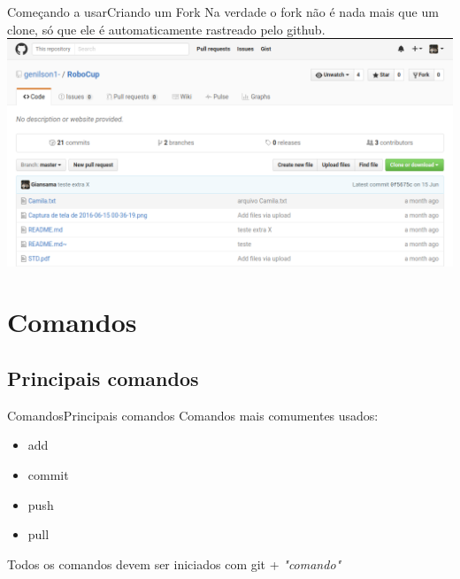 \documentclass[10pt]{beamer}
\begin{document}
\begin{frame}{Começando a usar}{Criando um Fork}
Na verdade o fork não é nada mais que um clone, só que ele é automaticamente rastreado pelo github.
\includegraphics[scale=0.27]{AAUgraphics/fork}
\end{frame}


\section{Comandos}
\subsection{Principais comandos}
\begin{frame}{Comandos}{Principais comandos}
Comandos mais comumentes usados:
	\begin{itemize}	
	\item add			
	\item commit			
	\item push			
	\item pull
	\end{itemize}	
\begin{flushright}
{\footnotesize Todos os comandos devem ser iniciados com git + \textit{"comando"}}
\end{flushright}
\end{frame}

\end{document}
